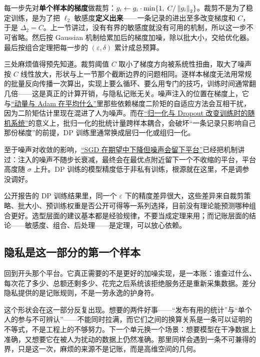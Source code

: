 每一步先对\textbf{单个样本的梯度}做裁剪：\(g_i\leftarrow g_i\cdot\min\{1,\;C/\left\lVert g_i\right\rVert_2\}\)。裁剪不是为了稳定训练，是为了把 \(\ell_2\) 敏感度\textbf{定义出来}——一条记录的进出至多改变梯度和 \(C\)，于是 \(\Delta_2=C\)。上一节讲过，没有有界的敏感度就没有可用的机制，所以这一步不可省略。然后按 Gaussian 机制给累加后的梯度加噪，除以批大小，交给优化器。最后按组合定理把每一步的 \((\varepsilon,\delta)\) 累计成总预算。

三处麻烦值得预先知道。裁剪阈值 \(C\) 取小了梯度方向被系统性扭曲，取大了噪声按 \(C\) 线性放大，形状与上一节那个截断边界的问题相同。逐样本梯度无法用常规的批量反向传播一次算出，实现上要么循环、要么用专门的技巧，训练时间通常翻几倍——这是真正的计算开销，与隐私记账无关。噪声注入的位置在梯度上，它与\hyperref[sec:14-Deep-Learning/03-Optimization-and-Training/02]{``动量与 Adam 在平均什么''}里那些依赖梯度二阶矩的自适应方法会互相干扰，因为二阶矩估计里现在混进了人为噪声。而在\hyperref[sec:14-Deep-Learning/03-Optimization-and-Training/03]{``归一化与 Dropout 改变训练时的随机系统''}的意义上，批归一化的批统计量跨样本耦合，会破坏``一条记录只影响自己那份梯度''的前提，DP 训练里通常换成层归一化或组归一化。

至于噪声对收敛的影响，\hyperref[sec:09-Convex-Optimization/08-Nonconvex-and-Stochastic-Optimization/04]{``SGD 在期望中下降但噪声会留下平台''}已经把机制讲过：注入的噪声不随步长衰减，最终会在最优点附近留下一个不收缩的平台，平台高度随 \(\sigma\) 上升。DP 训练的模型精度低于非私有训练，根源就在这里，不是调参没调好。

\begin{remark}
公开报告的 DP 训练结果里，同一个 \(\varepsilon\) 下的精度差异很大，这些差异来自裁剪策略、批大小、预训练权重是否公开可得等一系列选择，目前没有理论能预测哪种组合更好。选型层面的建议基本都是经验规律，不要当成定理来用；而记账层面的结论——敏感度、组合、后处理——是定理，可以放心依赖。
\end{remark}

\subsection{隐私是这一部分的第一个样本}

回到开头那个平台。它真正需要的不是更好的加噪实现，是一本账：谁查过什么、每次花了多少、总额还剩多少、花完之后系统该拒绝服务还是重新采集数据。差分隐私提供的是记账规则，不是一劳永逸的护身符。

这个形状会在这一部分反复出现。想要的两件好事——``发布有用的统计''与``单个人的参与不可辨认''——不能同时拉满，而它们之间的换算关系是一条可以证明的不等式，不是工程上的不够努力。下一个单元换一个场景：想要模型在干净数据上准确，又想要它在被人为扰动的数据上仍然准确。那里同样会遇到一条不可兼得的界，只是这一次，麻烦的来源不是记账，而是高维空间的几何。
